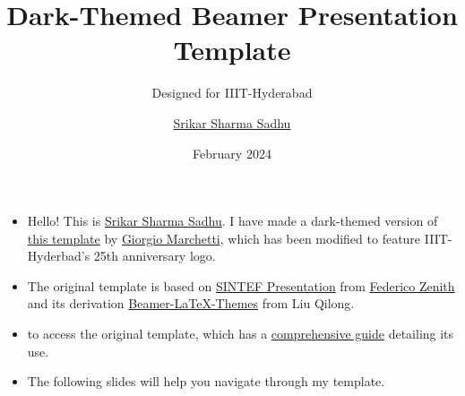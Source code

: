 \documentclass{beamer}
\title{Dark-Themed Beamer Presentation Template}
\subtitle{Designed for IIIT-Hyderabad}
\author{\href{mailto:srikar.sadhu@research.iiit.ac.in}{Srikar Sharma Sadhu}}
\date{February 2024}
\newcommand{\hrefcol}[2]{\textcolor{frmtxt}{\href{#1}{#2}}}
\begin{document}
\maketitle




\begin{frame}
    \begin{itemize}
        \item Hello! This is \hrefcol{mailto:srikar.sadhu@research.iiit.ac.in}{Srikar Sharma Sadhu}. I have made a dark-themed version of \hrefcol{https://www.overleaf.com/latex/templates/la-statale-universita-degli-studi-di-milano-unimi-presentation/ykkwvfdbqydr}{this template} by \hrefcol{mailto:ciao@gio.im}{Giorgio Marchetti}, which has been modified to feature IIIT-Hyderbad's 25th anniversary logo.
        \item The original template is based on \hrefcol{https://www.overleaf.com/latex/templates/sintef-presentation/jhbhdffczpnx}{SINTEF Presentation} from \hrefcol{mailto:federico.zenith@sintef.no}{Federico Zenith} and its derivation \hrefcol{https://github.com/TOB-KNPOB/Beamer-LaTeX-Themes}{Beamer-LaTeX-Themes} from Liu Qilong.
        \item \hrefcol{https://www.overleaf.com/project/new/template/32290?id=600526849\&latexEngine=pdflatex\&mainFile=beamer_statale.tex\&templateName=La+Statale+-+Universit\%C3\%A0+degli+Studi+di+Milano+\%7C+Unimi+-+Presentation\&texImage=texlive-full\%3A2023.1}{\beamerbutton{Click here}} to access the original template, which has a \hrefcol{https://www.overleaf.com/latex/templates/la-statale-universita-degli-studi-di-milano-unimi-presentation/ykkwvfdbqydr.pdf}{comprehensive guide} detailing its use.
        \item The following slides will help you navigate through my template.
    \end{itemize}
\end{frame}








\backmatter
\end{document}

